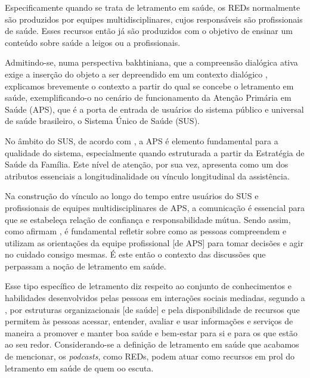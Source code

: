 Especificamente quando se trata de letramento em saúde, os REDs normalmente são produzidos por equipes multidisciplinares, cujos responsáveis são profissionais de saúde. Esses recursos então já são produzidos com o objetivo de ensinar um conteúdo sobre saúde a leigos ou a profissionais.

Admitindo-se, numa perspectiva bakhtiniana, que a compreensão dialógica ativa exige a inserção do objeto a ser depreendido em um contexto dialógico \cite{bakhtin2017}, explicamos brevemente o contexto a partir do qual se concebe o letramento em saúde, exemplificando-o no cenário de funcionamento da Atenção Primária em Saúde (APS), que é a porta de entrada de usuários do sistema público e universal de saúde brasileiro, o Sistema Único de Saúde (SUS).

No âmbito do SUS, de acordo com {\textcite{marques2022}}, a APS é elemento fundamental para a qualidade do sistema, especialmente quando estruturada a partir da Estratégia de Saúde da Família. Este nível de atenção, por sua vez, apresenta como um dos atributos essenciais a longitudinalidade ou vínculo longitudinal da assistência.

 Na construção do vínculo ao longo do tempo entre usuários do SUS e profissionais de equipes multidisciplinares de APS, a comunicação é essencial para que se estabeleça relação de confiança e responsabilidade mútua. Sendo assim, como afirmam \textcite{sampaio2015}, é fundamental refletir sobre como as pessoas compreendem e utilizam as orientações da equipe profissional [de APS] para tomar decisões e agir no cuidado consigo mesmas. É este então o contexto das discussões que perpassam a noção de letramento em saúde.

Esse tipo específico de letramento diz respeito ao conjunto de conhecimentos e habilidades desenvolvidos pelas pessoas em interações sociais mediadas, segundo a \textcite{who2021}, por estruturas organizacionais [de saúde] e pela disponibilidade de recursos que permitem às pessoas acessar, entender, avaliar e usar informações e serviços de maneira a promover e manter boa saúde e bem-estar para si e para os que estão ao seu redor. Considerando-se a definição de letramento em saúde que acabamos de mencionar, os \textit{podcasts}, como REDs, podem atuar como recursos em prol do letramento em saúde de quem oo escuta.

